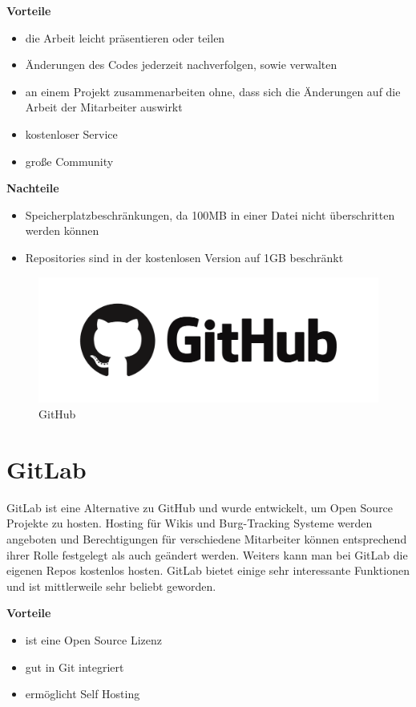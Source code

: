 \textbf{Vorteile}
\begin{itemize}
	\item die Arbeit leicht präsentieren oder teilen
	\item Änderungen des Codes jederzeit nachverfolgen, sowie verwalten
	\item an einem Projekt zusammenarbeiten ohne, dass sich die Änderungen auf die Arbeit der Mitarbeiter auswirkt
	\item kostenloser Service
	\item große Community
\end{itemize}

\textbf{Nachteile}
\begin{itemize}
	\item Speicherplatzbeschränkungen, da 100MB in einer Datei nicht überschritten werden können
	\item Repositories sind in der kostenlosen Version auf 1GB beschränkt
\end{itemize}


\begin{figure}[H]
	\centering
	\includegraphics[width=0.5\linewidth]{images/GitHub.png}
	\caption[GitHub]{GitHub}
	\label{fig:GitHub}
\end{figure}

\section{GitLab}
GitLab ist eine Alternative zu GitHub und wurde entwickelt, um Open Source Projekte zu hosten. Hosting für Wikis und Burg-Tracking Systeme werden angeboten und Berechtigungen für verschiedene Mitarbeiter können entsprechend ihrer Rolle festgelegt als auch geändert werden. Weiters kann man bei GitLab die eigenen Repos kostenlos hosten. GitLab bietet einige sehr interessante Funktionen und ist mittlerweile sehr beliebt geworden.   \parencite{GitHubVsGitLab}

\textbf{Vorteile}
\begin{itemize}
	\item ist eine Open Source Lizenz
	\item gut in Git integriert
	\item ermöglicht Self Hosting
\end{itemize}

